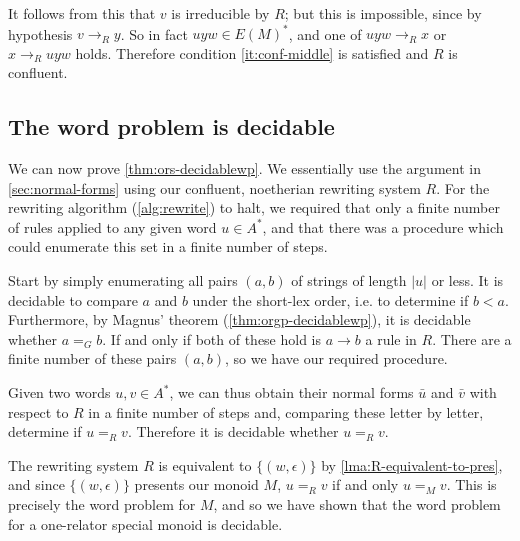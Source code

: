 \documentclass[showlabels,noindex,12pt]{lmaths}
\begin{document}
It follows from this that $v$ is irreducible by $R$; but this is impossible, since by hypothesis $v \to_R y$. So in fact $uyw \in E(M)^*$, and one of $uyw \to_R x$ or $x \to_R uyw$ holds. Therefore condition \ref{it:conf-middle} is satisfied and $R$ is confluent.


\subsection{The word problem is decidable}

We can now prove \cref{thm:ors-decidablewp}. We essentially use the argument in \cref{sec:normal-forms} using our confluent, noetherian rewriting system $R$. For the rewriting algorithm (\cref{alg:rewrite}) to halt, we required that only a finite number of rules applied to any given word $u \in A^*$, and that there was a procedure which could enumerate this set in a finite number of steps.

Start by simply enumerating all pairs $(a, b)$ of strings of length $|u|$ or less. It is decidable to compare $a$ and $b$ under the short-lex order, i.e. to determine if $b < a$. Furthermore, by Magnus' theorem (\cref{thm:orgp-decidablewp}), it is decidable whether $a =_G b$. If and only if both of these hold is $a \to b$ a rule in $R$. There are a finite number of these pairs $(a, b)$, so we have our required procedure.

Given two words $u, v \in A^*$, we can thus obtain their normal forms $\bar u$ and $\bar v$ with respect to $R$ in a finite number of steps and, comparing these letter by letter, determine if $u =_R v$. Therefore it is decidable whether $u =_R v$.

The rewriting system $R$ is equivalent to $\{(w, \epsilon)\}$ by \cref{lma:R-equivalent-to-pres}, and since $\{(w, \epsilon)\}$ presents our monoid $M$, $u =_R v$ if and only $u =_M v$. This is precisely the word problem for $M$, and so we have shown that the word problem for a one-relator special monoid is decidable.


\printbibliography

\printindex
\end{document}
